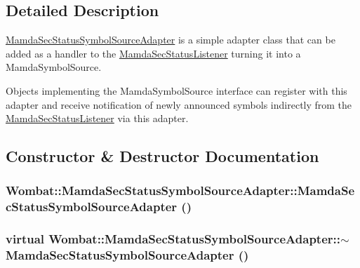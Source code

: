 \subsection{Detailed Description}
\hyperlink{classWombat_1_1MamdaSecStatusSymbolSourceAdapter}{Mamda\-Sec\-Status\-Symbol\-Source\-Adapter} is a simple adapter class that can be added as a handler to the \hyperlink{classWombat_1_1MamdaSecStatusListener}{Mamda\-Sec\-Status\-Listener} turning it into a Mamda\-Symbol\-Source. 

Objects implementing the Mamda\-Symbol\-Source interface can register with this adapter and receive notification of newly announced symbols indirectly from the \hyperlink{classWombat_1_1MamdaSecStatusListener}{Mamda\-Sec\-Status\-Listener} via this adapter. 



\subsection{Constructor \& Destructor Documentation}
\hypertarget{classWombat_1_1MamdaSecStatusSymbolSourceAdapter_ab1ff4e29b6e34af13c02fa1fa90e3f0}{
\subsubsection[MamdaSecStatusSymbolSourceAdapter]{\setlength{\rightskip}{0pt plus 5cm}Wombat::Mamda\-Sec\-Status\-Symbol\-Source\-Adapter::Mamda\-Sec\-Status\-Symbol\-Source\-Adapter ()}}
\label{classWombat_1_1MamdaSecStatusSymbolSourceAdapter_ab1ff4e29b6e34af13c02fa1fa90e3f0}


\hypertarget{classWombat_1_1MamdaSecStatusSymbolSourceAdapter_eefe3bdc4aebc9cbf00766a9e90898c3}{
\subsubsection[$\sim$MamdaSecStatusSymbolSourceAdapter]{\setlength{\rightskip}{0pt plus 5cm}virtual Wombat::Mamda\-Sec\-Status\-Symbol\-Source\-Adapter::$\sim$Mamda\-Sec\-Status\-Symbol\-Source\-Adapter ()}}
\label{classWombat_1_1MamdaSecStatusSymbolSourceAdapter_eefe3bdc4aebc9cbf00766a9e90898c3}




